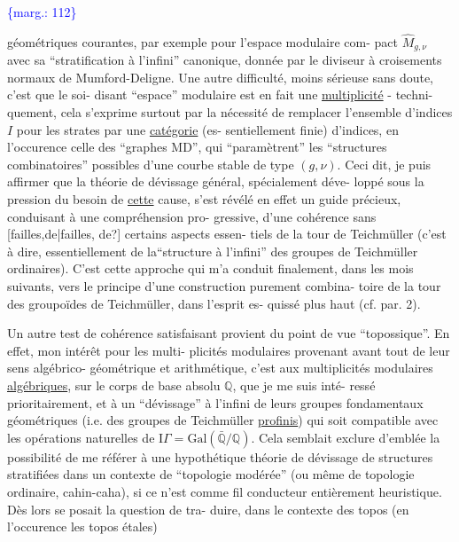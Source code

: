 \documentclass[11pt]{article}
\newcommand{\scanpage}[1]{\par\bigskip\noindent{\small\sffamily[scan #1]}\par}
\newcommand{\mspage}[1]{{\small\sffamily[p.\,#1]}}
\newcommand{\margin}[1]{\textcolor{blue}{\{\textsf{marg.:} #1\}}}
\newcommand{\uline}[1]{\underline{#1}}
\newcommand{\unsure}[1]{[#1?]}
\begin{document}
\margin{112}

\clearpage
\scanpage{119/113}
\mspage{35}

géométriques courantes, par exemple pour l'espace modulaire com-%
pact $\hat{M}_{g,\nu}$ avec sa ``stratification à l'infini'' canonique, donnée
par le diviseur à croisements normaux de Mumford-Deligne. Une
autre difficulté, moins sérieuse sans doute, c'est que le soi-%
disant ``espace'' modulaire est en fait une \uline{multiplicité} - techni-%
quement, cela s'exprime surtout par la nécessité de remplacer
l'ensemble d'indices $I$ pour les strates par une \uline{catégorie} (es-%
sentiellement finie) d'indices, en l'occurence celle des
``graphes MD'', qui ``paramètrent'' les ``structures combinatoires''
possibles d'une courbe stable de type $(g,\nu)$. Ceci dit, je puis
affirmer que la théorie de dévissage général, spécialement déve-%
loppé sous la pression du besoin de \uline{cette} cause, s'est révélé
en effet un guide précieux, conduisant à une compréhension pro-%
gressive, d'une cohérence sans \unsure{failles,de|failles, de} certains aspects essen-%
tiels de la tour de Teichmüller (c'est à dire, essentiellement
de la``structure à l'infini'' des groupes de Teichmüller ordinaires).
C'est cette approche qui m'a conduit finalement, dans les mois
suivants, vers le principe d'une construction purement combina-%
toire de la tour des groupoïdes de Teichmüller, dans l'esprit es-%
quissé plus haut (cf. par. 2).

Un autre test de cohérence satisfaisant provient du
point de vue ``topossique''. En effet, mon intérêt pour les multi-%
plicités modulaires provenant avant tout de leur sens algébrico-%
géométrique et arithmétique, c'est aux multiplicités modulaires
\uline{algébriques}, sur le corps de base absolu $\mathbb{Q}$, que je me suis inté-%
ressé prioritairement, et à un ``dévissage'' à l'infini de leurs
groupes fondamentaux géométriques (i.e. des groupes de Teichmüller
\uline{profinis}) qui soit compatible avec les opérations naturelles de
$\mathrm{I}\!\Gamma = \mathrm{Gal}(\bar{\mathbb{Q}}/\mathbb{Q})$. Cela semblait exclure d'emblée la possibilité de me
référer à une hypothétique théorie de dévissage de structures
stratifiées dans un contexte de ``topologie modérée'' (ou même de
topologie ordinaire, cahin-caha), si ce n'est comme fil conducteur
entièrement heuristique. Dès lors se posait la question de tra-%
duire, dans le contexte des topos (en l'occurence les topos étales)
\end{document}
